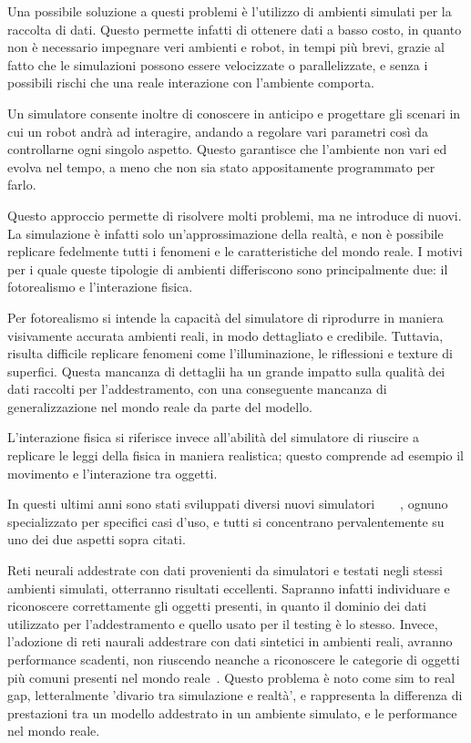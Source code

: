 \documentclass[12pt]{report}
\begin{document}
Una possibile soluzione a questi problemi è l'utilizzo di ambienti simulati per la raccolta di dati. Questo permette infatti di ottenere dati a basso costo, in quanto non è necessario impegnare veri ambienti e robot, in tempi più brevi, grazie al fatto che le simulazioni possono essere velocizzate o parallelizzate, e senza i possibili rischi che una reale interazione con l'ambiente comporta.

Un simulatore consente inoltre di conoscere in anticipo e progettare gli scenari in cui un robot andrà ad interagire, andando a regolare vari parametri così da controllarne ogni singolo aspetto. Questo garantisce che l'ambiente non vari ed evolva nel tempo, a meno che non sia stato appositamente programmato per farlo.

Questo approccio permette di risolvere molti problemi, ma ne introduce di nuovi. La simulazione è infatti solo un'approssimazione della realtà, e non è possibile replicare fedelmente tutti i fenomeni e le caratteristiche del mondo reale. I motivi per i quale queste tipologie di ambienti differiscono sono principalmente due: il fotorealismo e l'interazione fisica.

Per fotorealismo si intende la capacità del simulatore di riprodurre in maniera visivamente accurata ambienti reali, in modo dettagliato e credibile. Tuttavia, risulta difficile replicare fenomeni come l'illuminazione, le riflessioni e texture di superfici. Questa mancanza di dettaglii ha un grande impatto sulla qualità dei dati raccolti per l'addestramento, con una conseguente mancanza di generalizzazione nel mondo reale da parte del modello.

L'interazione fisica si riferisce invece all'abilità del simulatore di riuscire a replicare le leggi della fisica in maniera realistica; questo comprende ad esempio il movimento e l'interazione tra oggetti.

In questi ultimi anni sono stati sviluppati diversi nuovi simulatori~\cite{kolve2022ai2thorinteractive3denvironment}~\cite{NEURIPS2021_021bbc7e}~\cite{urakami2022doorgymscalabledooropening}~\cite{1389727}, ognuno specializzato per specifici casi d'uso, e tutti si concentrano pervalentemente su uno dei due aspetti sopra citati.

Reti neurali addestrate con dati provenienti da simulatori e testati negli stessi ambienti simulati, otterranno risultati eccellenti. Sapranno infatti individuare e riconoscere correttamente gli oggetti presenti, in quanto il dominio dei dati utilizzato per l'addestramento e quello usato per il testing è lo stesso. Invece, l'adozione di reti naurali addestrare con dati sintetici in ambienti reali, avranno performance scadenti, non riuscendo neanche a riconoscere le categorie di oggetti più comuni presenti nel mondo reale~\cite{8793591}. Questo problema è noto come sim to real gap, letteralmente 'divario tra simulazione e realtà', e rappresenta la differenza di prestazioni tra un modello addestrato in un ambiente simulato, e le performance nel mondo reale.
\end{document}
